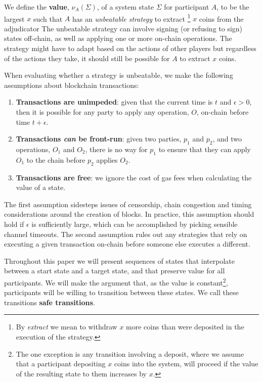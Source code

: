 \documentclass{article}
\begin{document}
We define the \textbf{value}, $\nu_A(\Sigma)$, of a system state $\Sigma$ for participant $A$,
to be the largest $x$ such that $A$ has an \textit{unbeatable strategy} to extract
\footnote{By \textit{extract} we mean to withdraw $x$ more coins than were deposited in the execution of the strategy.}
$x$ coins from the adjudicator
The unbeatable strategy can involve signing (or refusing to sign) states off-chain, as well as
applying one or more on-chain operations.
The strategy might have to adapt based on the actions of other players but regardless of
the actions they take, it should still be possible for $A$ to extract $x$ coins.

When evaluating whether a strategy is unbeatable, we make the following assumptions about blockchain transactions:
\begin{enumerate}
  \item \textbf{Transactions are unimpeded}: given that the current time is $t$ and $\epsilon > 0$, then it is possible for any party to apply any operation, $O$, on-chain before time $t + \epsilon$.
  \item \textbf{Transactions \textit{can} be front-run}: given two parties, $p_1$ and $p_2$, and two operations, $O_1$ and $O_2$, there is no way for $p_1$ to ensure that they can apply $O_1$ to the chain before $p_2$ applies $O_2$.
  \item \textbf{Transactions are free}: we ignore the cost of gas fees when calculating the value of a state.
\end{enumerate}
The first assumption sidesteps issues of censorship, chain congestion and timing considerations around the creation of blocks.
In practice, this assumption should hold if $\epsilon$ is sufficiently large, which can be accomplished by picking sensible channel timeouts.
The second assumption rules out any strategies that rely on executing a given transaction on-chain before someone else executes a different.

Throughout this paper we will present sequences of states that interpolate between a start state and a target state, and that preserve value for all participants.
We will make the argument that, as the value is constant\footnote{
The one exception is any transition involving a deposit, where we assume that a participant depositing
$x$ coins into the system, will proceed if the value of the resulting state to them increases by $x$.
}, participants will be willing to transition between these states.
We call these transitions \textbf{safe transitions}.
\end{document}
